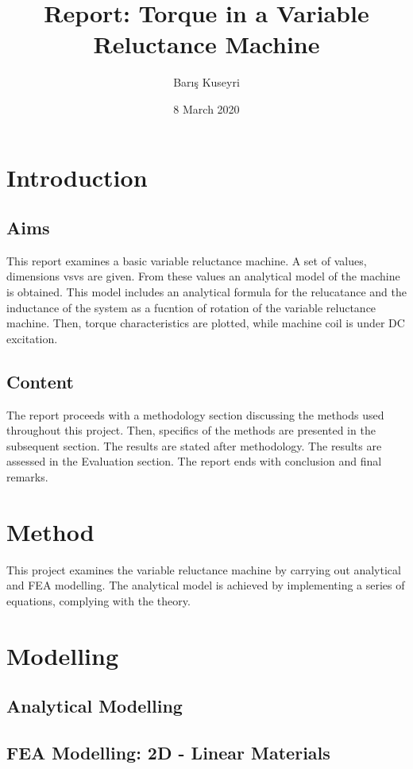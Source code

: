 \documentclass[a4paper, 11pt]{article}
\begin{document}
\title{Report: Torque in a Variable Reluctance Machine}
\author{Barış Kuseyri}
\date{8 March 2020}
\maketitle

\tableofcontents
\newpage

\section{Introduction}
\label{sec1}
\subsection{Aims}

This report examines a basic variable reluctance machine. A set of values, dimensions vsvs are given. From these values an analytical model of the machine is obtained. This model includes an analytical formula for the relucatance and the inductance of the system as a fucntion of rotation of the variable reluctance machine. Then, torque characteristics are plotted, while machine coil is under DC excitation.
\subsection{Content}
The report proceeds with a methodology section discussing the methods used throughout this project. Then, specifics of the methods are presented in the subsequent section. The results are stated after methodology. The results are assessed in the Evaluation section. The report ends with conclusion and final remarks.

\section{Method}
This project examines the variable reluctance machine by carrying out analytical and FEA modelling. The analytical model is achieved by implementing a series of equations, complying with the theory. 
\section{Modelling}
\subsection{Analytical Modelling}
\subsection{FEA Modelling: 2D - Linear Materials}
\end{document}
